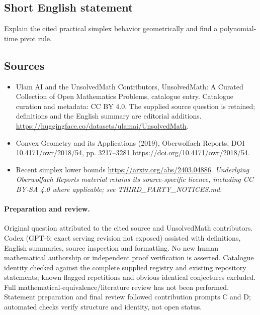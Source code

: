 \documentclass[11pt]{article}
\begin{document}
\subsection{Short English statement}
Explain the cited practical simplex behavior geometrically and find a polynomial-time pivot rule.
\subsection{Sources}
\begin{itemize}
\item[\hypertarget{source:statement:1}{S1}] Ulam AI and the UnsolvedMath Contributors, UnsolvedMath: A Curated Collection of Open Mathematics Problems, catalogue entry. Catalogue curation and metadata: CC BY 4.0. The supplied source question is retained; definitions and the English summary are editorial additions.
\url{https://huggingface.co/datasets/ulamai/UnsolvedMath}.
\item[\hypertarget{source:statement:2}{S2}] Convex Geometry and its Applications (2019), Oberwolfach Reports, DOI 10.4171/owr/2018/54, pp. 3217--3281
\url{https://doi.org/10.4171/owr/2018/54}.
\item[\hypertarget{source:statement:3}{S3}] Recent simplex lower bounds
\url{https://arxiv.org/abs/2403.04886}.
\textit{Underlying Oberwolfach Reports material retains its source-specific licence, including CC BY-SA 4.0 where applicable; see THIRD\_PARTY\_NOTICES.md.}
\end{itemize}
\paragraph{Preparation and review.}
Original question attributed to the cited source and UnsolvedMath contributors. Codex (GPT-6; exact serving revision not exposed) assisted with definitions, English summaries, source inspection and formatting. No new human mathematical authorship or independent proof verification is asserted. Catalogue identity checked against the complete supplied registry and existing repository statements; known flagged repetitions and obvious identical conjectures excluded. Full mathematical-equivalence/literature review has not been performed. Statement preparation and final review followed contribution prompts C and D; automated checks verify structure and identity, not open status.
\label{end:statement}
\end{document}
